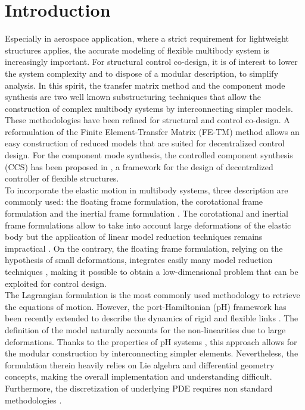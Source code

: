 \documentclass{svjour3}                     %
\begin{document}
\section{Introduction}
\label{intro}
Especially in aerospace application, where a strict requirement for lightweight structures applies, the accurate modeling  of flexible multibody system is increasingly important. For structural control co-design, it is of interest to lower the system complexity and to dispose of a modular description, to simplify analysis. In this spirit, the transfer matrix method \cite{Rui2005} and the component mode synthesis \cite{HurtyCMS} are two well known substructuring techniques that allow the construction of complex multibody systems by interconnecting simpler models. These methodologies have been refined for structural and control co-design. A reformulation of the Finite Element-Transfer Matrix (FE-TM) method \cite{TAN199047} allows an easy construction of reduced models that are suited for decentralized control design. For the component mode synthesis, the controlled component synthesis (CCS) has been proposed in \cite{YoungCMS}, a framework for the design of decentralized controller of flexible structures. \\
\indent To incorporate the elastic motion in multibody systems, three description are commonly used: the floating frame formulation, the corotational frame formulation and the inertial frame formulation \cite{Ellenbroek2018}. The corotational and inertial frame formulations allow to take into account large deformations of the elastic body but the application of linear model reduction techniques remains impractical \cite{Noor_rev}. On the contrary, the floating frame formulation, relying on the hypothesis of small deformations, integrates easily many model reduction techniques \cite{NOWAKOWSKI201240}, making it possible to obtain a low-dimensional problem that can be exploited for control design. \\
\indent The Lagrangian formulation is the most commonly used methodology to retrieve the equations of motion. However, the port-Hamiltonian (pH) framework \cite{bookPHs} has been recently extended to describe the dynamics of rigid and flexible links \cite{macchelli_fl,macchelli_flrig}. The definition of the model naturally accounts for the non-linearities due to large deformations. Thanks to the properties of pH systems \cite{CerveraIntFinite},  this approach allows for the modular construction by interconnecting simpler elements. Nevertheless, the formulation therein heavily relies on Lie algebra and differential geometry concepts, making the overall implementation and understanding difficult. Furthermore, the discretization of underlying PDE requires non standard methodologies \cite{Golo}. \\
\end{document}
